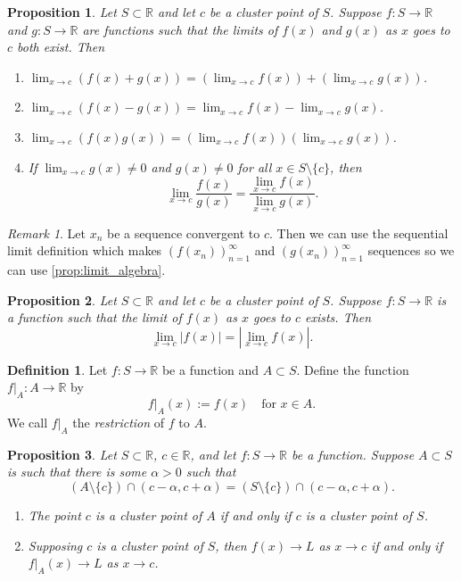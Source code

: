 \documentclass{article}
\newtheorem{proposition}{Proposition}[section]
\theoremstyle{definition}
\newtheorem{definition}{Definition}[section]
\theoremstyle{remark}
\newtheorem{remark}{Remark}[section]
\begin{document}
\vspace{.5cm}
\begin{proposition}
Let $S \subset \mathbb{R}$ and let $c$ be a cluster point of $S$. Suppose $f : S \to \mathbb{R}$ and $g : S \to \mathbb{R}$ are functions such that the limits of $f(x)$ and $g(x)$ as $x$ goes to $c$ both exist. Then
\begin{enumerate}
\item $\lim_{x\to c} (f(x) + g(x)) = \left(\lim_{x\to c} f(x)\right) + \left(\lim_{x\to c} g(x)\right)$.
\item $\lim_{x\to c} (f(x) - g(x)) = \lim_{x\to c} f(x) - \lim_{x\to c} g(x)$.
\item $\lim_{x\to c} (f(x)g(x)) = \left(\lim_{x\to c} f(x)\right) \left(\lim_{x\to c} g(x)\right)$.
\item If $\lim_{x\to c} g(x) \neq 0$ and $g(x) \neq 0$ for all $x \in S \setminus \{c\}$, then
\[
\lim_{x\to c} \frac{f(x)}{g(x)} = \frac{\lim_{x\to c} f(x)}{\lim_{x\to c} g(x)}.
\]
\end{enumerate}
\end{proposition}
\begin{remark}
Let $x_n$ be a sequence convergent to $c$. Then we can use the sequential limit definition 
which makes $(f(x_n))^\infty_{n=1}$ and $(g(x_n))^\infty_{n=1}$ sequences so we can use \ref{prop:limit_algebra}.
\end{remark}


\vspace{.5cm}

\begin{proposition}
Let $S \subset \mathbb{R}$ and let $c$ be a cluster point of $S$. Suppose $f : S \to \mathbb{R}$ is a function such that the limit of $f(x)$ as $x$ goes to $c$ exists. Then
\[
\lim_{x\to c} |f(x)| = \left| \lim_{x\to c} f(x) \right|.
\]
\end{proposition}


\vspace{.5cm}
\begin{definition}
Let $f : S \to \mathbb{R}$ be a function and $A \subset S$. Define the function $f|_A : A \to \mathbb{R}$ by
\[
f|_A(x) := f(x) \quad \text{for } x \in A.
\]
We call $f|_A$ the \textit{restriction} of $f$ to $A$.
\end{definition}


\vspace{.5cm}
\begin{proposition}
Let $S \subset \mathbb{R}$, $c \in \mathbb{R}$, and let $f : S \to \mathbb{R}$ be a function. Suppose $A \subset S$ is such that there is some $\alpha > 0$ such that
\[
(A \setminus \{c\}) \cap (c - \alpha, c + \alpha) = (S \setminus \{c\}) \cap (c - \alpha, c + \alpha).
\]
\begin{enumerate}
\item The point $c$ is a cluster point of $A$ if and only if $c$ is a cluster point of $S$.
\item Supposing $c$ is a cluster point of $S$, then $f(x) \to L$ as $x \to c$ if and only if $f|_A(x) \to L$ as $x \to c$.
\end{enumerate}
\end{proposition}
\end{document}
